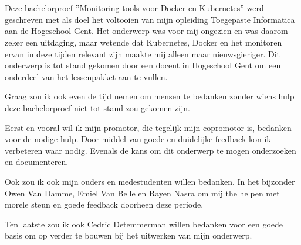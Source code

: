 \chapter*{}
\label{ch:voorwoord}

Deze bachelorproef ''Monitoring-tools voor Docker en Kubernetes'' werd geschreven met als doel het voltooien van mijn opleiding Toegepaste Informatica aan de Hogeschool Gent. Het onderwerp was voor mij ongezien en was daarom zeker een uitdaging, maar wetende dat Kubernetes, Docker en het monitoren ervan in deze tijden relevant zijn maakte mij alleen maar nieuwsgieriger. Dit onderwerp is tot stand gekomen door een docent in Hogeschool Gent om een onderdeel van het lessenpakket aan te vullen.

Graag zou ik ook even de tijd nemen om mensen te bedanken zonder wiens hulp deze bachelorproef niet tot stand zou gekomen zijn.

Eerst en vooral wil ik mijn promotor, die tegelijk mijn copromotor is, bedanken voor de nodige hulp. Door middel van goede en duidelijke feedback kon ik verbeteren waar nodig. Evenals de kans om dit onderwerp te mogen onderzoeken en documenteren.

Ook zou ik ook mijn ouders en medestudenten willen bedanken. In het bijzonder
Owen Van Damme, Emiel Van Belle en Rayen Nasra om mij the helpen met
morele steun en goede feedback doorheen deze periode.

Ten laatste zou ik ook Cedric Detemmerman willen bedanken voor een goede basis om op verder te bouwen bij het uitwerken van mijn onderwerp.